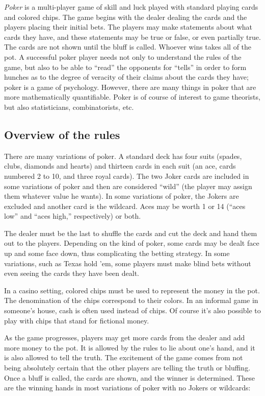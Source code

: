 \documentclass[12pt]{article}
\begin{document}
{\em Poker} is a multi-player game of skill and luck played with standard playing cards and colored chips. The game begins with the dealer dealing the cards and the players placing their initial bets. The players may make statements about what cards they have, and these statements may be true or false, or even partially true. The cards are not shown until the bluff is called. Whoever wins takes all of the pot. A successful poker player needs not only to understand the rules of the game, but also to be able to ``read'' the opponents for ``tells'' in order to form hunches as to the degree of veracity of their claims about the cards they have; poker is a game of psychology. However, there are many things in poker that are more mathematically quantifiable. Poker is of course of interest to game theorists, but also statisticians, combinatorists, etc.

\subsection{Overview of the rules}

There are many variations of poker. A standard deck has four suits (spades, clubs, diamonds and hearts) and thirteen cards in each suit (an ace, cards numbered 2 to 10, and three royal cards). The two Joker cards are included in some variations of poker and then are considered ``wild'' (the player may assign them whatever value he wants). In some variations of poker, the Jokers are excluded and another card is the wildcard. Aces may be worth 1 or 14 (``aces low'' and ``aces high,'' respectively) or both.

The dealer must be the last to shuffle the cards and cut the deck and hand them out to the players. Depending on the kind of poker, some cards may be dealt face up and some face down, thus complicating the betting strategy. In some variations, such as Texas hold 'em, some players must make blind bets without even seeing the cards they have been dealt.

In a casino setting, colored chips must be used to represent the money in the pot. The denomination of the chips correspond to their colors. In an informal game in someone's house, cash is often used instead of chips. Of course it's also possible to play with chips that stand for fictional money.

As the game progresses, players may get more cards from the dealer and add more money to the pot. It is allowed by the rules to lie about one's hand, and it is also allowed to tell the truth. The excitement of the game comes from not being absolutely certain that the other players are telling the truth or bluffing. Once a bluff is called, the cards are shown, and the winner is determined. These are the winning hands in most variations of poker with no Jokers or wildcards:
\end{document}
